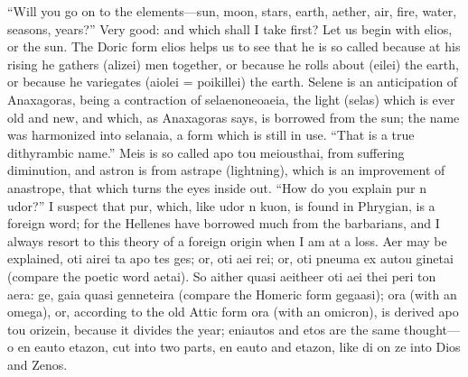 \documentclass[11pt,letter]{article}
\begin{document}
\par  “Will you go on to the elements—sun, moon, stars, earth, aether, air, fire, water, seasons, years?” Very good: and which shall I take first? Let us begin with elios, or the sun. The Doric form elios helps us to see that he is so called because at his rising he gathers (alizei) men together, or because he rolls about (eilei) the earth, or because he variegates (aiolei = poikillei) the earth. Selene is an anticipation of Anaxagoras, being a contraction of selaenoneoaeia, the light (selas) which is ever old and new, and which, as Anaxagoras says, is borrowed from the sun; the name was harmonized into selanaia, a form which is still in use. “That is a true dithyrambic name.” Meis is so called apo tou meiousthai, from suffering diminution, and astron is from astrape (lightning), which is an improvement of anastrope, that which turns the eyes inside out. “How do you explain pur n udor?” I suspect that pur, which, like udor n kuon, is found in Phrygian, is a foreign word; for the Hellenes have borrowed much from the barbarians, and I always resort to this theory of a foreign origin when I am at a loss. Aer may be explained, oti airei ta apo tes ges; or, oti aei rei; or, oti pneuma ex autou ginetai (compare the poetic word aetai). So aither quasi aeitheer oti aei thei peri ton aera: ge, gaia quasi genneteira (compare the Homeric form gegaasi); ora (with an omega), or, according to the old Attic form ora (with an omicron), is derived apo tou orizein, because it divides the year; eniautos and etos are the same thought—o en eauto etazon, cut into two parts, en eauto and etazon, like di on ze into Dios and Zenos.
\end{document}
